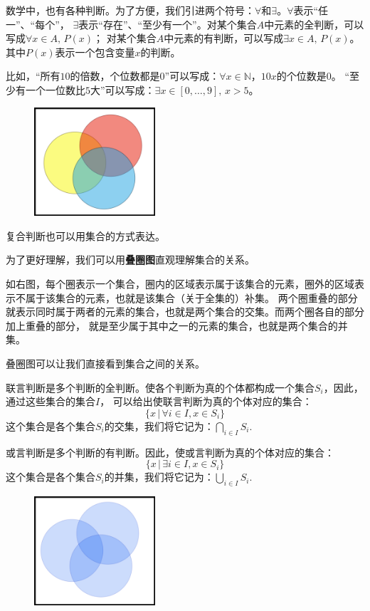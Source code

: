 \documentclass[12pt,UTF8]{ctexbook}
\begin{document}
数学中，也有各种判断。为了方便，我们引进两个符号：$\forall$和$\exists$。$\forall$表示“任一”、“每个”，
$\exists$表示“存在”、“至少有一个”。对某个集合$A$中元素的全判断，可以写成$\forall x \in A, \, P(x)$；
对某个集合$A$中元素的有判断，可以写成$\exists x \in A, \, P(x)$。其中$P(x)$表示一个包含变量$x$的判断。

比如，“所有$10$的倍数，个位数都是$0$”可以写成：$\forall x \in \mathbb{N}$，$ 10 x$的个位数是$0$。
“至少有一个一位数比$5$大”可以写成：$\exists x \in [0,\ldots ,9], \, x > 5$。

\begin{figure} %
    \flushright
    \includegraphics[width=0.4\textwidth]{叠圈图0.png}
\end{figure}

复合判断也可以用集合的方式表达。

为了更好理解，我们可以用\textbf{叠圈图}直观理解集合的关系。

如右图，每个圈表示一个集合，圈内的区域表示属于该集合的元素，圈外的区域表示不属于该集合的元素，也就是该集合（关于全集的）补集。
两个圈重叠的部分就表示同时属于两者的元素的集合，也就是两个集合的交集。而两个圈各自的部分加上重叠的部分，
就是至少属于其中之一的元素的集合，也就是两个集合的并集。

叠圈图可以让我们直接看到集合之间的关系。

联言判断是多个判断的全判断。使各个判断为真的个体都构成一个集合$S_i$，因此，通过这些集合的集合$I$，
可以给出使联言判断为真的个体对应的集合：
$$ \{x \,| \,\forall i \in I, x \in S_i \} $$
这个集合是各个集合$S_i$的交集，我们将它记为：$ \bigcap_{i\in I} S_i. $

或言判断是多个判断的有判断。因此，使或言判断为真的个体对应的集合：
$$ \{x \,|\, \exists i \in I, x \in S_i \} $$
这个集合是各个集合$S_i$的并集，我们将它记为：$ \bigcup_{i\in I} S_i. $

\begin{figure} %
    \flushright
    \includegraphics[width=0.4\textwidth]{叠圈图1.png}
\end{figure}
\end{document}
